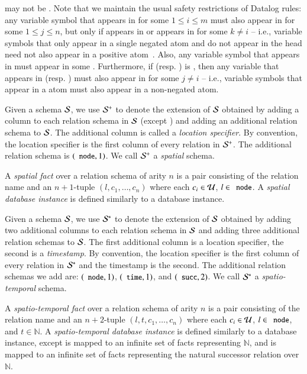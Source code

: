  may not be \dedalus{<}.  Note that we maintain the usual safety
restrictions of Datalog rules: any variable symbol  that appears in
 for some $1 \leq i \leq m$ must also appear in
 for some $1 \leq j \leq n$, but only if 
appears in  or  appears in
 for some $k \neq i$ -- i.e., variable symbols that
only appear in a single negated atom and do not appear in the head need not also
appear in a positive atom~\cite{ullmanbook}.  Also, any variable symbol  that appears in  must appear in some .
Furthermore, if  (resp. ) is \dedalus{<}, then any variable that appears in  (resp. ) must also appear in  for some $j \neq i$ -- i.e., variable symbols that appear in a \dedalus{<} atom must also appear in a non-negated atom.

Given a schema $\schema$, we use $\sschema$ to denote the extension of $\schema$
obtained by adding a column to each relation schema in $\schema$ (except
\dedalus{<}) and adding an additional relation schema to $\schema$.  The
additional column is called a {\em location specifier}.  By convention, the
location specifier is the first column of every relation in $\sschema$.  The
additional relation schema is $(\dedalus{node},1)$.  We call $\sschema$ a {\em
  spatial} schema.

A {\em spatial fact} over a relation schema of arity $n$ is a pair consisting of the relation name and an $n+1$-tuple $(l,c_1,\ldots,c_n)$ where each $c_i \in \univ$, $l \in \dedalus{node}$.  A {\em spatial database instance} is defined similarly to a database instance.

Given a schema $\schema$, we use $\stschema$ to denote the extension of
$\schema$ obtained by adding two additional columns to each relation schema in $\schema$ and adding three additional relation schemas to $\schema$. 
The first additional column is a location specifier, the second is a {\em timestamp}.  By convention, the location specifier is the first column of every relation in $\stschema$ and the timestamp is the second.  
The additional relation schemas we add are: $(\dedalus{node},1)$,
$(\dedalus{time},1)$, and $(\dedalus{succ},2)$.
We call $\stschema$ a {\em spatio-temporal} schema.

A {\em spatio-temporal fact} over a relation schema of arity $n$ is a pair consisting of the relation name and an $n+2$-tuple $(l,t,c_1,\ldots,c_n)$ where each $c_i \in \univ$, $l \in \dedalus{node}$, and $t \in \mathbb{N}$.  A {\em spatio-temporal database instance} is defined similarly to a database instance, except  is mapped to an infinite set of  facts representing $\mathbb{N}$, and  is mapped to an infinite set of  facts representing the natural successor relation over $\mathbb{N}$.

